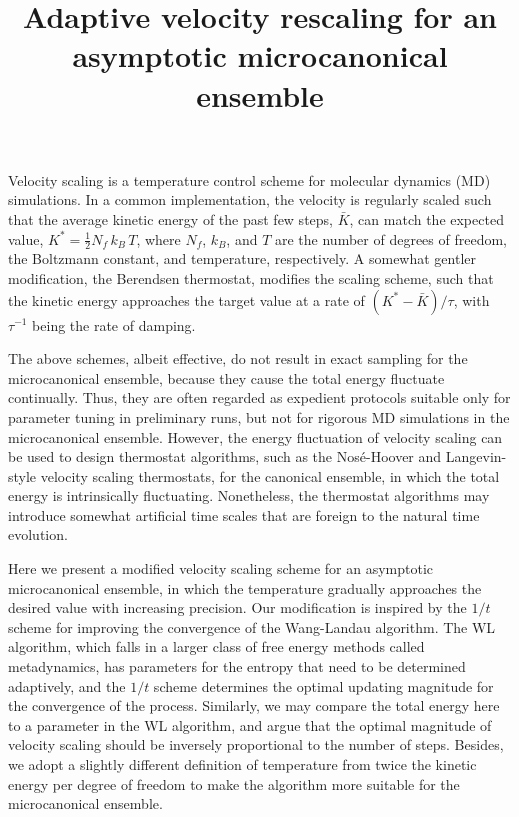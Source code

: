 \documentclass[reprint]{revtex4-1}
\begin{document}
\title{Adaptive velocity rescaling for an asymptotic
microcanonical ensemble}
\author{}
\maketitle



Velocity scaling is a temperature control scheme
for molecular dynamics (MD) simulations.
%
In a common implementation,
the velocity is regularly scaled such that the average
kinetic energy of the past few steps, $\bar K$,
can match the expected value,
$K^* = \frac{1}{2} N_f \, k_B \, T$,
where $N_f$, $k_B$, and $T$ are the number of degrees of freedom,
the Boltzmann constant, and temperature, respectively.
%
A somewhat gentler modification, the Berendsen thermostat\cite{berendsen1984},
modifies the scaling scheme, such that
the kinetic energy approaches the target value at a rate of
$\left( K^* - \bar K \right)/\tau$,
with $\tau^{-1}$ being the rate of damping.

The above schemes, albeit effective,
do not result in exact sampling for the microcanonical ensemble,
because they cause the total energy fluctuate continually.
%
Thus, they are often regarded as expedient protocols
suitable only for parameter tuning in preliminary runs,
but not for rigorous MD simulations in the microcanonical ensemble.
%
However, the energy fluctuation of velocity scaling
can be used to design thermostat algorithms,
such as the Nos\'e-Hoover\cite{nose1984, nose1984mp, hoover1985, martyna1992}
and Langevin-style velocity scaling\cite{bussi2007} thermostats,
for the canonical ensemble, in which the total energy
is intrinsically fluctuating.
%
Nonetheless, the thermostat algorithms may introduce
somewhat artificial time scales that are foreign to the natural time evolution.

Here we present a modified velocity scaling scheme
for an asymptotic microcanonical ensemble,
in which
the temperature gradually approaches the desired value with increasing precision.
%
Our modification is inspired by the $1/t$ scheme\cite{
  belardinelli2007, belardinelli2007jcp, belardinelli2008,
  zhou2005, zhou2008, morozov2007}
for improving the convergence of the Wang-Landau algorithm\cite{
  wang2001, wang2001pre}.
The WL algorithm,
which falls in a larger class of free energy methods
called metadynamics\cite{
  laio2002, laio2008, marsili2006},
has parameters for the entropy that need to be
determined adaptively,
and the $1/t$ scheme determines the optimal updating magnitude
for the convergence of the process.
%
Similarly, we may compare the total energy here
to a parameter in the WL algorithm,
and argue that the optimal magnitude
of velocity scaling should be inversely proportional
to the number of steps.
%
Besides, we adopt a slightly different definition of temperature\cite{rugh1997}
from twice the kinetic energy per degree of freedom
to make the algorithm more suitable for the microcanonical ensemble.
\end{document}
